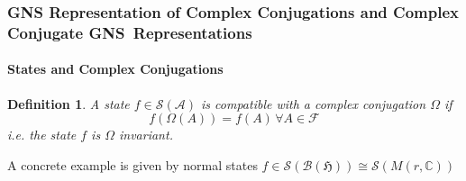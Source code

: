 \documentclass[aps,preprint]{revtex4}
\newtheorem{definition}[theorem]{Definition}
\begin{document}
\subsubsection{GNS Representation of Complex Conjugations and Complex
Conjugate GNS\ Representations}

\paragraph{States and Complex Conjugations}

\begin{definition}
A state $f\in \mathcal{S}\left( \mathcal{A}\right) $ is compatible with a
complex conjugation $\Omega $ if 
\begin{equation}
f\left( \Omega \left( A\right) \right) =f\left( A\right) \,\forall A\in 
\mathcal{F}
\end{equation}%
i.e. the state $f$ is $\Omega $ invariant.
\end{definition}

A concrete example is given by normal states $f\in \mathcal{S}\left( 
\mathcal{B}\left( \mathfrak{H}\right) \right) \cong \mathcal{S}\left(
M\left( r,\mathbb{C}\right) \right) $
\end{document}
